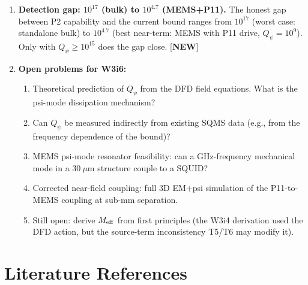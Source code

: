 \documentclass[11pt,twocolumn]{article}
\newcommand{\Meff}{M_{\rm eff}}
\newcommand{\Qpsi}{Q_\psi}
\theoremstyle{definition}
\theoremstyle{remark}
\begin{document}
\begin{enumerate}
\item \textbf{Detection gap: $10^{17}$ (bulk) to $10^{4.7}$ (MEMS+P11).}
  The honest gap between P2 capability and the current bound ranges
  from $10^{17}$ (worst case: standalone bulk) to $10^{4.7}$ (best
  near-term: MEMS with P11 drive, $\Qpsi = 10^9$). Only with
  $\Qpsi \geq 10^{15}$ does the gap close. [\textbf{NEW}]

\item \textbf{Open problems for W3i6:}
  \begin{enumerate}[nosep]
  \item[{[W3i5-QP-1]}] Theoretical prediction of $\Qpsi$ from the
    DFD field equations. What is the psi-mode dissipation mechanism?
  \item[{[W3i5-QP-2]}] Can $\Qpsi$ be measured indirectly from existing
    SQMS data (e.g., from the frequency dependence of the bound)?
  \item[{[W3i5-ME-1]}] MEMS psi-mode resonator feasibility: can a
    GHz-frequency mechanical mode in a $30~\mu$m structure couple to
    a SQUID?
  \item[{[W3i5-CE-1]}] Corrected near-field coupling: full 3D EM+psi
    simulation of the P11-to-MEMS coupling at sub-mm separation.
  \item[{[W3i4-MP-1]}] Still open: derive $\Meff$ from first principles
    (the W3i4 derivation used the DFD action, but the source-term
    inconsistency T5/T6 may modify it).
  \end{enumerate}

\end{enumerate}

\section*{Literature References}
\end{document}
